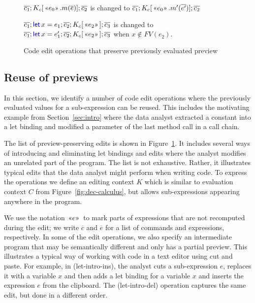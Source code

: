 \documentclass[english,crc]{programming}
\theoremstyle{plain}
\theoremstyle{definition}
\newcommand{\kvd}[1]{\textnormal{\textcolor{kvdclr}{\sffamily #1}}}
\newcommand{\rname}[1]{{\sffamily(#1)}}
\newcommand{\ername}[1]{\vspace{0.75em}\rname{#1}\hspace{0.5em}}
\newcommand{\preview}[1]{\,\textnormal{\guillemotleft} #1\textnormal{\guillemotright}\,}
\begin{document}
\begin{figure}[t]
\begin{minipage}[c]{0.868\textwidth}
  \ername{edit-mem}
  $\overline{c_1}; K_c[\preview{e_0}.m(\overline{e})]; \overline{c_2}$ is changed to
  $\overline{c_1}; K_c[\preview{e_0}.m'(\overline{e'})]; \overline{c_2}$

  \ername{edit-let}
  $\overline{c_1}; \kvd{let}\,x=e_1; \overline{c_2}; K_c[\preview{e_2}]; \overline{c_3}$ is changed to
  $\overline{c_1}; \kvd{let}\,x=e'_1; \overline{c_2}; K_c[\preview{e_2}]; \overline{c_3}$ \hspace{2em} when
  $x\notin FV(e_2)$.
\end{minipage}

\caption{Code edit operations that preserve previously evaluated preview}
\label{fig:operations}
\vspace{-0.5em}
\end{figure}


\subsection{Reuse of previews}
\label{sec:evaluation-reuse}

In this section, we identify a number of code edit operations where the previously evaluated
values for a sub-expression can be reused. This includes the motivating example from
Section~\ref{sec:intro} where the data analyst extracted a constant into a let binding and
modified a parameter of the last method call in a call chain.

The list of preview-preserving edits is shown in Figure~\ref{fig:operations}.
It includes several ways of introducing and eliminating let bindings and edits where the analyst
modifies an unrelated part of the program. The list is not exhaustive. Rather, it illustrates
typical edits that the data analyst might perform when writing code. To express the operations we
define an editing context $K$ which is similar to evaluation context $C$ from Figure~\ref{fig:dec-calculus},
but allows sub-expressions appearing anywhere in the program.

We use the notation $\preview{e}$ to mark parts of expressions that are not recomputed
during the edit; we write $\overline{c}$ and $\overline{e}$ for a list of commands and expressions,
respectively. In some of the edit operations, we also specify an intermediate program that may be
semantically different and only has a partial preview. This illustrates a typical way of
working with code in a text editor using cut and paste. For example, in
\rname{let-intro-ins}, the analyst cuts a sub-expression $e$, replaces it with
a variable $x$ and then adds a let binding for a variable $x$ and inserts the expression $e$
from the clipboard. The \rname{let-intro-del} operation captures the same edit, but
done in a different order.
\end{document}
